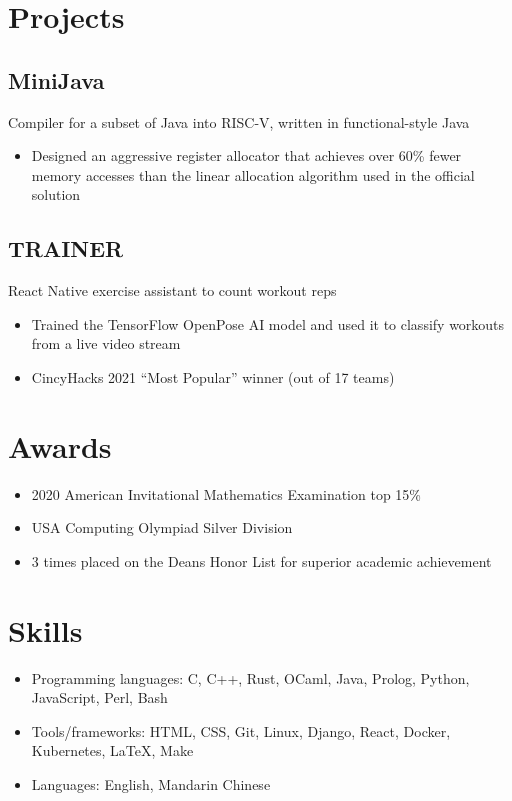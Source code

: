 \documentclass{article}
\begin{document}
\section*{Projects}

\subsection*{MiniJava} Compiler for a subset of Java into RISC-V, written in
                       functional-style Java
\begin{itemize}
      \item Designed an aggressive register allocator that achieves over 60\%
            fewer memory accesses than the linear allocation algorithm used in
            the official solution
\end{itemize}

\subsection*{TRAINER} React Native exercise assistant to count workout reps
\begin{itemize}
  \item Trained the TensorFlow OpenPose AI model and used it to classify
        workouts from a live video stream

  \item CincyHacks 2021 ``Most Popular'' winner (out of 17 teams)
\end{itemize}

\section*{Awards}

\begin{itemize}
  \item 2020 American Invitational Mathematics Examination top 15\%

  \item USA Computing Olympiad Silver Division

  \item 3 times placed on the Deans Honor List for superior academic achievement
\end{itemize}

\section*{Skills}

\begin{itemize}
  \item Programming languages: C, C++, Rust, OCaml, Java, Prolog, Python,
        JavaScript, Perl, Bash

  \item Tools/frameworks: HTML, CSS, Git, Linux, Django, React, Docker,
        Kubernetes, LaTeX, Make

  \item Languages: English, Mandarin Chinese
\end{itemize}
\end{document}
